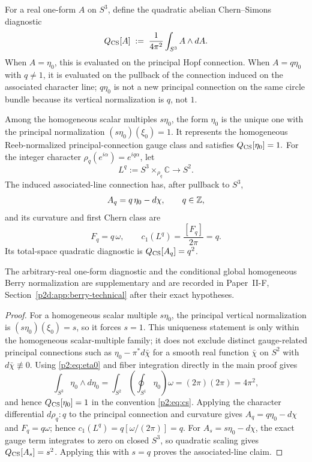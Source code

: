 \documentclass[12pt,a4paper]{article}
\begin{document}
\begin{definition}
\label{p2:def:cs-charge}
For a real one-form \(A\) on \(S^3\), define the quadratic abelian
Chern--Simons diagnostic
\begin{equation}
\label{p2:eq:cs}
Q_{\mathrm{CS}}[A] \;:=\; \frac{1}{4\pi^2}\int_{S^3} A\wedge dA.
\end{equation}
When \(A=\eta_0\), this is evaluated on the principal Hopf connection.  When
\(A=q\eta_0\) with \(q\ne1\), it is evaluated on the pullback of the
connection induced on the associated character line; \(q\eta_0\) is not a
new principal connection on the same circle bundle because its vertical
normalization is \(q\), not \(1\).
\end{definition}


\begin{proposition}
\label{p2:prop:hopfion-charge}
Among the homogeneous scalar multiples \(s\eta_0\), the form \(\eta_0\) is
the unique one with the principal normalization
\((s\eta_0)(\xi_0)=1\).  It represents the homogeneous Reeb-normalized principal-connection gauge
class and satisfies
\(
Q_{\mathrm{CS}}[\eta_0]=1.
\)
For the integer character
\(\rho_q(e^{i\alpha})=e^{iq\alpha}\), let
\[
        L^q:=S^3\times_{\rho_q}\mathbb C\longrightarrow S^2.
\]
The induced associated-line connection has, after pullback to \(S^3\),
\begin{equation}
\label{p2:eq:Aq0-q0eta0}
A_q=q\,\eta_0-d\chi,
\qquad q\in\mathbb{Z},
\end{equation}
and its curvature and first Chern class are
\[
        F_q=q\,\omega,
        \qquad
        c_1(L^q)=\frac{[F_q]}{2\pi}=q.
\]
Its total-space quadratic diagnostic is
\(Q_{\mathrm{CS}}[A_q]=q^2\).

The arbitrary-real one-form diagnostic and the conditional global homogeneous
Berry normalization are supplementary and are recorded in
Paper~II-F, Section~\ref{p2d:app:berry-technical} after their exact hypotheses.
\end{proposition}

\begin{proof}
For a homogeneous scalar multiple \(s\eta_0\), the principal vertical
normalization is
\((s\eta_0)(\xi_0)=s\), so it forces \(s=1\).  This uniqueness statement is
only within the homogeneous scalar-multiple family; it does not exclude
distinct gauge-related principal connections such as
\(\eta_0-\pi^*d\bar\chi\) for a smooth real function
\(\bar\chi\) on \(S^2\) with \(d\bar\chi\not\equiv0\).
Using \eqref{p2:eq:eta0} and fiber integration directly in the main proof gives
\[
 \int_{S^3}\eta_0\wedge d\eta_0
 =\int_{S^2}\!\left(\oint_{S^1}\eta_0\right)\omega
 =(2\pi)(2\pi)=4\pi^2,
\]
and hence \(Q_{\mathrm{CS}}[\eta_0]=1\) in the convention
\eqref{p2:eq:cs}.  Applying the character differential
\(d\rho_q:q\) to the principal connection and curvature gives
\(A_q=q\eta_0-d\chi\) and \(F_q=q\omega\); hence
\(c_1(L^q)=q[\omega/(2\pi)]=q\).  For
\(A_s=s\eta_0-d\chi\), the exact gauge term integrates to zero on closed
\(S^3\), so quadratic scaling gives
\(Q_{\mathrm{CS}}[A_s]=s^2\).  Applying this with \(s=q\) proves the associated-line
claim.
\end{proof}
\end{document}
